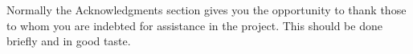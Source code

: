 \begin{acknowledgments}
Normally the Acknowledgments section gives you the opportunity to thank those to whom you are indebted for assistance in the project. This should be done briefly and in good taste.

\end{acknowledgments}